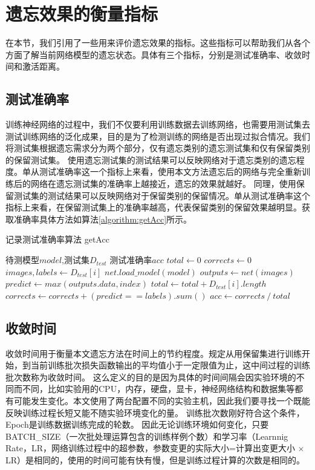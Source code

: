 \section{遗忘效果的衡量指标} \label{forget_evaluation_index}
在本节，我们引用了一些用来评价遗忘效果的指标。这些指标可以帮助我们从各个方面了解当前网络模型的遗忘状态。具体有三个指标，分别是测试准确率、收敛时间和激活距离。

\subsection{测试准确率}
训练神经网络的过程中，我们不仅要利用训练数据去训练网络，也需要用测试集去测试训练网络的泛化成果，目的是为了检测训练的网络是否出现过拟合情况。我们将测试集根据遗忘需求分为两个部分，仅有遗忘类别的遗忘测试集和仅有保留类别的保留测试集。
使用遗忘测试集的测试结果可以反映网络对于遗忘类别的遗忘程度。单从测试准确率这一个指标上来看，使用本文方法遗忘后的网络与完全重新训练后的网络在遗忘测试集的准确率上越接近，遗忘的效果就越好。
同理，使用保留测试集的测试结果可以反映网络对于保留类别的保留情况。单从测试准确率这个指标上来看，在保留测试集上的准确率越高，代表保留类别的保留效果越明显。获取准确率具体方法如算法\ref{algorithm:getAcc}所示。
\begin{algorithm}
	\renewcommand{\algorithmicrequire}{\textbf{Input:}}
	\renewcommand{\algorithmicensure}{\textbf{Output:}}
	\caption{记录测试准确率算法  getAcc}
	\label{algorithm:getAcc}
	\begin{algorithmic}[1]
        \REQUIRE 待测模型$model$,测试集$D_{test}$
        \ENSURE  测试准确率$acc$
        \STATE $total \gets 0$
        \STATE $corrects \gets 0$
            \STATE $images, labels \gets D_{test}[i]$
            \STATE $net.load\_model(model)$
            \STATE $outputs \gets net(images)$
            \STATE $predict \gets max(outputs.data, index)$
            \STATE $total \gets total + D_{test}[i].length$
            \STATE $corrects \gets corrects + (predict == labels).sum()$
        \ENDFOR
        \STATE $acc \gets corrects {\ } / {\ } total$
	\end{algorithmic}  
\end{algorithm}

\subsection{收敛时间}
收敛时间用于衡量本文遗忘方法在时间上的节约程度。规定从用保留集进行训练开始，到当前训练批次损失函数输出的平均值小于一定限值为止，这中间过程的训练批次数称为收敛时间。
这么定义的目的是因为具体的时间间隔会因实验环境的不同而不同，比如实验用的CPU，内存，硬盘，显卡，神经网络结构和数据集等都有可能发生变化。本文使用了两台配置不同的实验主机，因此我们要寻找一个既能反映训练过程长短又能不随实验环境变化的量。
训练批次数刚好符合这个条件，Epoch是训练数据训练完成的轮数。
因此无论训练环境如何变化，只要BATCH\_SIZE（一次批处理运算包含的训练样例个数）和学习率（Learnnig Rate，LR，网络训练过程中的超参数，参数变更的实际大小=计算出变更大小 $\times$ LR）是相同的，使用的时间可能有快有慢，但是训练过程计算的次数是相同的。

